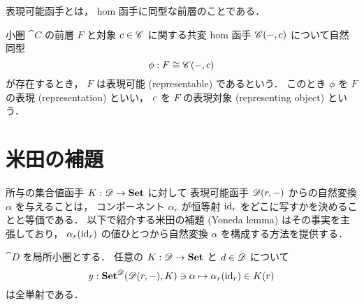 \documentclass[titlepage]{ltjsreport}
\begin{document}
表現可能函手とは，
hom 函手に同型な前層のことである．

\begin{definition}[表現可能函手]
  \def\C{\cat{C}}%
  \def\c{\obj{c}}%
  \def\F{F}%
  \def\iso{\phi}%
  小圏 $\C$ の前層 $\F$ と対象 $\c\in\objs{\C}$
  に関する共変 hom 函手 $\mrps{\C}{-}{\c}$ について自然同型
  \begin{equation}
    \iso:\F\cong\mrps{\C}{-}{\c}
  \end{equation}
  が存在するとき，
  $\F$ は表現可能 (representable) であるという．
  このとき $\iso$ を $\F$ の表現 (representation) といい，
  $\c$ を $\F$ の表現対象 (representing object) という．
\end{definition}

\section{米田の補題}

所与の集合値函手 ${K}:{\mathscr{D}}\to{\mathbf{Set}}$ に対して
表現可能函手 $\mathscr{D}(r,-)$ からの自然変換 $\alpha$ を与えることは，
コンポーネント $\alpha_r$ が恒等射 $\mathrm{id}_{r}$
をどこに写すかを決めることと等価である．
以下で紹介する米田の補題 (Yoneda lemma) はその事実を主張しており，
$\alpha_r(\mathrm{id}_{r})$ の値ひとつから自然変換 $\alpha$ を構成する方法を提供する．

\begin{theorem}[米田の補題]
  \def\c{\obj{c}}%
  \def\d{\obj{d}}%
  \def\r{\obj{r}}%
  $\cat{D}$ を局所小圏とする．
  任意の ${K}:{\mathscr{D}}\to{\mathbf{Set}}$ と $\d\in\objs{\cat{D}}$ について
  \begin{equation}
    y:\set^\cat{D}(\mrps{\cat{D}}{\r}{-},K)\ni\alpha\mapsto\alpha_r(\id{\r})\in K(\r)
  \end{equation}
  は全単射である．
\end{theorem}
\end{document}
